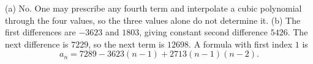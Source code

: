 (a) No. One may prescribe any fourth term and interpolate a cubic polynomial through the four values, so the three values alone do not determine it.
(b) The first differences are $-3623$ and $1803$, giving constant second difference $5426$. The next difference is $7229$, so the next term is $\boxed{12698}$. A formula with first index $1$ is
\[a_n=7289-3623(n-1)+2713(n-1)(n-2).\]
